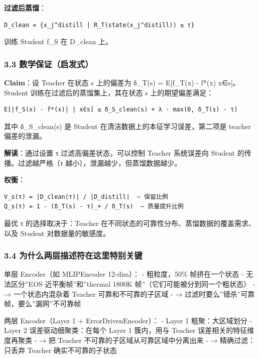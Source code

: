 \documentclass[
  12pt,
]{ctexart}
\begin{document}
\textbf{过滤后蒸馏}：

\begin{verbatim}
D_clean = {x_j^distill | R_T(state(x_j^distill)) ≤ τ}
\end{verbatim}

训练 Student f\_S 在 D\_clean 上。

\subsubsection{3.3
数学保证（启发式）}\label{ux6570ux5b66ux4fddux8bc1ux542fux53d1ux5f0f}

\textbf{Claim}：设 Teacher 在状态 s 上的偏差为 δ\_T(s) =
\textbar E{[}f\_T(x) - f*(x) \textbar{} x∈s{]}\textbar。Student
训练在过滤后的蒸馏集上，其在状态 s 上的期望偏差满足：

\begin{verbatim}
E[|f_S(x) - f*(x)| | x∈s] ≤ δ_S_clean(s) + λ · max(0, δ_T(s) - τ)
\end{verbatim}

其中 δ\_S\_clean(s) 是 Student 在清洁数据上的本征学习误差，第二项是
teacher 偏差的泄漏。

\textbf{解读}：通过设置 τ 过滤高偏差状态，可以控制 Teacher 系统误差向
Student 的传播。过滤越严格（τ 越小），泄漏越少，但蒸馏数据越少。

\textbf{权衡}：

\begin{verbatim}
V_s(τ) = |D_clean(τ)| / |D_distill|  — 保留比例
Q_s(τ) = 1 - (δ_T(s) - τ)_+ / δ_T(s)  — 质量提升比例
\end{verbatim}

最优 τ 的选择取决于：Teacher
在不同状态的可靠性分布、蒸馏数据的覆盖需求、以及 Student
对数据量的敏感度。

\subsubsection{3.4
为什么两层描述符在这里特别关键}\label{ux4e3aux4ec0ux4e48ux4e24ux5c42ux63cfux8ff0ux7b26ux5728ux8fd9ux91ccux7279ux522bux5173ux952e}

单层 Encoder（如 MLIPEncoder 12-dim）： - 粗粒度，50\% 帧挤在一个状态 -
无法区分''EOS 近平衡帧''和''thermal 1800K
帧''（它们可能被分到同一个粗状态） - → 一个状态内混杂着 Teacher
可靠和不可靠的子区域 - → 过滤时要么''错杀''可靠帧，要么''漏网''不可靠帧

两层 Encoder（Layer 1 + ErrorDrivenEncoder）： - Layer 1
粗聚：大区域划分 - Layer 2 误差驱动细聚类：在每个 Layer 1 簇内，用与
Teacher 误差相关的特征维度再聚类 - → 把 Teacher
不可靠的子区域从可靠区域中分离出来 - → 精确过滤：只丢弃 Teacher
确实不可靠的子状态
\end{document}
